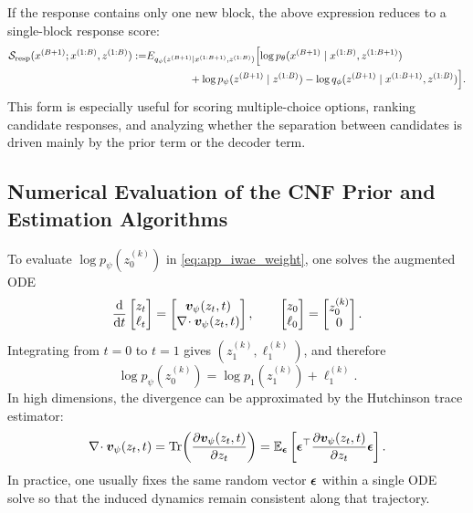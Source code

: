 If the response contains only one new block, the above expression reduces to a single-block response score:
\begin{align}
\mathcal S_{\mathrm{resp}}(x^{(B+1)};x^{(1:B)},z^{(1:B)})
:=
&E_{q_{\phi}(z^{(B+1)}\mid x^{(1:B+1)},z^{(1:B)})}\Bigl[
\log p_{\theta}(x^{(B+1)}\mid x^{(1:B)},z^{(1:B+1)}) \\
&\qquad\qquad +\log p_{\psi}(z^{(B+1)}\mid z^{(1:B)})
-\log q_{\phi}(z^{(B+1)}\mid x^{(1:B+1)},z^{(1:B)})
\Bigr].
\label{eq:app_single_block_score}
\end{align}
This form is especially useful for scoring multiple-choice options, ranking candidate responses, and analyzing whether the separation between candidates is driven mainly by the prior term or the decoder term.

\subsection{Numerical Evaluation of the CNF Prior and Estimation Algorithms}
\label{app:algorithms}

To evaluate $\log p_{\psi}(z_0^{(k)})$ in \eqref{eq:app_iwae_weight}, one solves the augmented ODE
\begin{equation}
\frac{\mathrm{d}}{\mathrm{d} t}
\begin{bmatrix}
z_t \\
\ell_t
\end{bmatrix}
=
\begin{bmatrix}
\bm{v}_{\psi}(z_t,t) \\
\nabla\!\cdot \bm{v}_{\psi}(z_t,t)
\end{bmatrix},
\qquad
\begin{bmatrix}
z_0 \\
\ell_0
\end{bmatrix}
=
\begin{bmatrix}
z_0^{(k)} \\
0
\end{bmatrix}.
\label{eq:app_augmented_ode}
\end{equation}
Integrating from $t=0$ to $t=1$ gives $(z_1^{(k)},\ell_1^{(k)})$, and therefore
\begin{equation}
\log p_{\psi}(z_0^{(k)})
=
\log p_1(z_1^{(k)})+\ell_1^{(k)}.
\label{eq:app_prior_eval_again}
\end{equation}
In high dimensions, the divergence can be approximated by the Hutchinson trace estimator:
\begin{equation}
\nabla\!\cdot \bm{v}_{\psi}(z_t,t)
=
\mathrm{Tr}\!\left(\frac{\partial \bm{v}_{\psi}(z_t,t)}{\partial z_t}\right)
=
\mathbb{E}_{\bm{\epsilon}}\left[\bm{\epsilon}^{\top}
\frac{\partial \bm{v}_{\psi}(z_t,t)}{\partial z_t}
\bm{\epsilon}\right].
\label{eq:app_hutchinson}
\end{equation}
In practice, one usually fixes the same random vector $\bm{\epsilon}$ within a single ODE solve so that the induced dynamics remain consistent along that trajectory.

